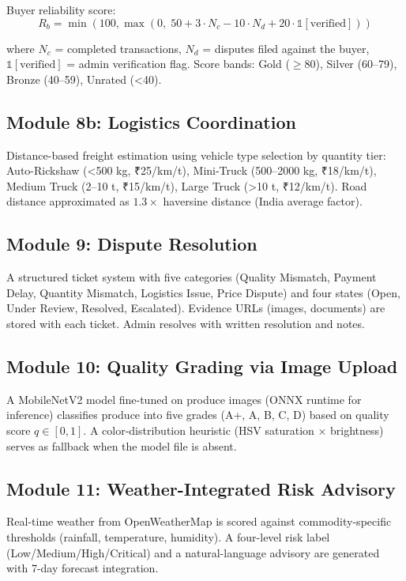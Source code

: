 \documentclass[conference]{IEEEtran}
\begin{document}
Buyer reliability score:
\begin{equation}
R_b = \min(100, \max(0, \; 50 + 3 \cdot N_c - 10 \cdot N_d + 20 \cdot \mathbb{1}[\text{verified}]))
\end{equation}

where $N_c$ = completed transactions, $N_d$ = disputes filed against the buyer, $\mathbb{1}[\text{verified}]$ = admin verification flag. Score bands: Gold ($\geq$80), Silver (60–79), Bronze (40–59), Unrated (<40).

\subsection{Module 8b: Logistics Coordination}
Distance-based freight estimation using vehicle type selection by quantity tier: Auto-Rickshaw (<500 kg, ₹25/km/t), Mini-Truck (500–2000 kg, ₹18/km/t), Medium Truck (2–10 t, ₹15/km/t), Large Truck (>10 t, ₹12/km/t). Road distance approximated as $1.3 \times$ haversine distance (India average factor).

\subsection{Module 9: Dispute Resolution}
A structured ticket system with five categories (Quality Mismatch, Payment Delay, Quantity Mismatch, Logistics Issue, Price Dispute) and four states (Open, Under Review, Resolved, Escalated). Evidence URLs (images, documents) are stored with each ticket. Admin resolves with written resolution and notes.

\subsection{Module 10: Quality Grading via Image Upload}
A MobileNetV2 model fine-tuned on produce images (ONNX runtime for inference) classifies produce into five grades (A+, A, B, C, D) based on quality score $q \in [0, 1]$. A color-distribution heuristic (HSV saturation × brightness) serves as fallback when the model file is absent.

\subsection{Module 11: Weather-Integrated Risk Advisory}
Real-time weather from OpenWeatherMap is scored against commodity-specific thresholds (rainfall, temperature, humidity). A four-level risk label (Low/Medium/High/Critical) and a natural-language advisory are generated with 7-day forecast integration.
\end{document}
